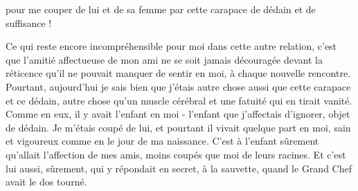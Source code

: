 pour me couper de lui et de sa femme par cette carapace de dédain et de suffisance !

Ce qui reste encore incompréhensible pour moi dans cette autre relation, c'est que l'amitié affectueuse de mon ami ne se soit jamais découragée devant la réticence qu'il ne pouvait manquer de sentir en moi, à chaque nouvelle rencontre. Pourtant, aujourd'hui je sais bien que j'étais autre chose aussi que cette carapace et ce dédain, autre chose qu'un muscle cérébral et une fatuité qui en tirait vanité. Comme en eux, il y avait l'enfant en moi - l'enfant que j'affectais d'ignorer, objet de dédain. Je m'étais coupé de lui, et pourtant il vivait quelque part en moi, sain et vigoureux comme en le jour de ma naissance. C'est à l'enfant sûrement qu'allait l'affection de mes amis, moins coupés que moi de leurs racines. Et c'est lui aussi, sûrement, qui y répondait en secret, à la sauvette, quand le Grand Chef avait le dos tourné.


